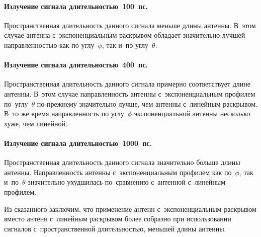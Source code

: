 \paragraph*{Излучение сигнала длительностью~100~пс.}
Пространственная длительность данного сигнала меньше длины антенны. В~этом
случае антенна с~экспоненциальным раскрывом обладает значительно лучшей
направленностью как по углу~$\phi$, так и~по углу~$\theta$.

\paragraph*{Излучение сигнала длительностью~400~пс.}
Пространственная длительность данного сигнала примерно соответствует длине
антенны. В~этом случае направленность антенны с~экспоненциальным профилем
по~углу~$\theta$ по-прежнему значительно лучше, чем антенны с~линейным
раскрывом. В~то же время направленность по углу~$\phi$ экспоненциальной антенны
несколько хуже, чем линейной.

\paragraph*{Излучение сигнала длительностью~1000~пс.}
Пространственная длительность данного сигнала значительно больше длины антенны.
Направленность антенны с~экспоненциальным профилем как по~$\phi$, так
и~по~$\theta$ значительно ухудшилась по~сравнению с~антенной с~линейным
профилем.

Из сказанного заключим, что применение антенн с~экспоненциальным раскрывом
вместо антенн с~линейным раскрывом более собразно при использовании сигналов
с~пространственной длительностью, меньшей длины антенны.
